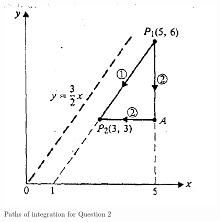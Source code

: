 \documentclass[12pt,a4paper]{article}
\begin{document}
\begin{figure}[H]
\centering
\includegraphics[scale=0.6]{Figure2-10Cheng.png}
\caption{Paths of integration for Question 2 \cite[Figure 2--10, page 23]{Cheng}}
\label{Cheng-integral}
\end{figure}


\end{document}
